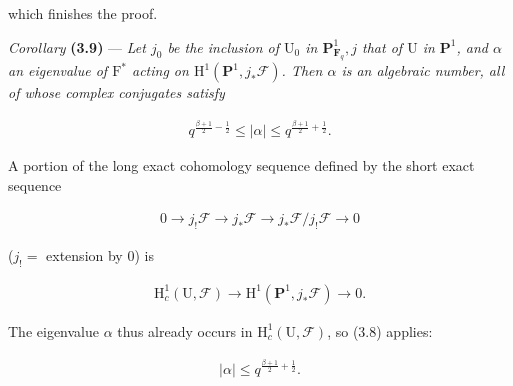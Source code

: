 \documentclass[10pt,leqno]{article}
\begin{document}
\noindent which finishes the proof.\par

\noindent \emph{Corollary} \textbf{(3.9)} — {\itshape Let \(j_{0}\) be the inclusion of \(\mathrm{U}_{0}\) in \(\mathbf{P}^{1}_{\mathbf{F}_{q}}, j\) that of \(\mathrm{U}\) in \(\mathbf{P}^{1}\), and \(\alpha \) an eigenvalue of \(\mathrm{F}^{*}\) acting on \(\mathrm{H}^{1}(\mathbf{P}^{1},j_{*}\mathcal{F} )\). Then \(\alpha \) is an algebraic number, all of whose complex conjugates satisfy}\par

\begin{equation*}\begin{gathered}q^{\frac{\beta+1}{2}- \frac{1}{2}} \leq  |\alpha | \leq  q^{\frac{\beta+1}{2}+\frac{1}{2}}.\end{gathered}\end{equation*}

\noindent A portion of the long exact cohomology sequence defined by the short exact sequence\par

\begin{equation*}\begin{gathered}0 \longrightarrow  j_{!}\mathcal{F}  \longrightarrow  j_{*}\mathcal{F}  \longrightarrow  j_{*}\mathcal{F} /j_{!}\mathcal{F}  \longrightarrow  0\end{gathered}\end{equation*}

\noindent (\(j_{!} =\) extension by 0) is\par

\begin{equation*}\begin{gathered}\mathrm{H}_{c}^{1}(\mathrm{U},\mathcal{F} ) \longrightarrow  \mathrm{H}^{1}(\mathbf{P}^{1},j_{*}\mathcal{F} ) \longrightarrow  0.\end{gathered}\end{equation*}

\clearpage

\label{physical-16}

\noindent The eigenvalue \(\alpha \) thus already occurs in \(\mathrm{H}_{c}^{1}(\mathrm{U},\mathcal{F} )\), so (3.8) applies:\par

\begin{equation*}\begin{gathered}|\alpha | \leq  q^{\frac{\beta+1}{2}+\frac{1}{2}}.\end{gathered}\end{equation*}
\end{document}
